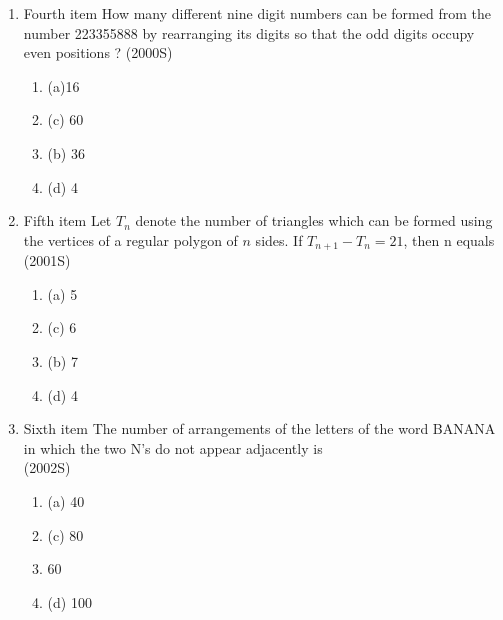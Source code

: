 \documentclass[journal,12pt,twocolumn]{IEEEtran}
\theoremstyle{remark}
\begin{document}
\begin{enumerate}[start=3]
\begin{multicols}{2}
\begin{enumerate}
[label=, left=0pt, labelsep=0pt, itemsep=1em]
\item (a) $216$\item (c) 600\item(b) $240$\item (d) 3125\\[4pt]
\end{enumerate}
\end{multicols}
\item Fourth item How many different nine digit numbers can be formed from the number 223355888 by rearranging its digits so that the odd digits occupy even positions ?
\hfill{(2000S)}\\
\begin{multicols}{2} 
\begin{enumerate}
[label=, left=0pt, labelsep=0pt, itemsep=1em]
\item(a)16 \item (c) 60\item(b) 36\item(d) 4
\end{enumerate}
\end{multicols}
\item Fifth item Let $T_n$ denote the number of triangles which can be formed using the vertices of a regular polygon of $n$ sides. If $T_{n+1}-T_n=21$, then n equals
\hfill{(2001S)}\\
\begin{multicols}{2} 
\begin{enumerate}
[label=, left=0pt, labelsep=0pt, itemsep=1em]
\item(a) 5\item(c) 6\item (b) 7\item (d) 4
\end{enumerate}
\end{multicols}
\item Sixth item The number of arrangements of the letters of the word BANANA in which the two N's do not appear adjacently is\\
\hfill{(2002S)}
\begin{multicols}{2} 
\begin{enumerate}
[label=, left=0pt, labelsep=0pt, itemsep=1em]
\item (a) 40\item(c) 80\item {} 60\item (d) 100
\end{enumerate}
\end{multicols}

\end{enumerate}
\end{document}

